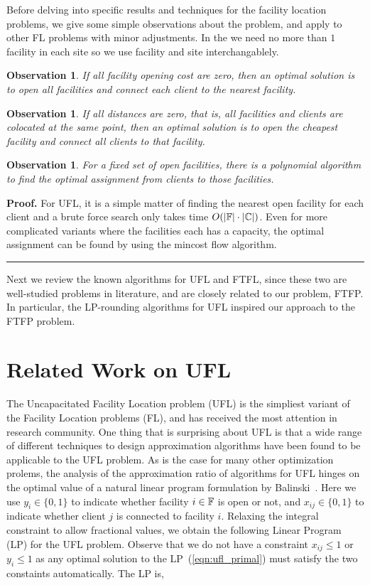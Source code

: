 \documentclass[oneside,final]{ucr}
\newtheorem{observation}[theorem]{Observation}
\newenvironment{proof}[1][Proof]{\textbf{#1.} }{\ \rule{0.5em}{0.5em}}
\begin{document}
Before delving into specific results and techniques for the
facility location problems, we give some simple observations
about the {\UFL} problem, and apply to other FL problems
with minor adjustments. In the {\UFL} we need no more than
$1$ facility in each site so we use facility and site
interchangablely.
\begin{observation}
  If all facility opening cost are zero, then an optimal
  solution is to open all facilities and connect each client
  to the nearest facility.
\end{observation}

\begin{observation}
  If all distances are zero, that is, all facilities and
  clients are colocated at the same point, then an optimal
  solution is to open the cheapest facility and connect all
  clients to that facility.
\end{observation}

\begin{observation}
  For a fixed set of open facilities, there is a polynomial
  algorithm to find the optimal assignment from clients to
  those facilities.
\end{observation}
\begin{proof}
  For UFL, it is a simple matter of finding the nearest open
  facility for each client and a brute force search only
  takes time $O(|\mathbb{F}|\cdot |\mathbb{C}|)$. Even for
  more complicated variants where the facilities each has a
  capacity, the optimal assignment can be found by using the
  mincost flow algorithm.
\end{proof}

Next we review the known algorithms for UFL and FTFL, since
these two are well-studied problems in literature, and are
closely related to our problem, FTFP. In particular, the
LP-rounding algorithms for UFL inspired our approach to the
FTFP problem.

\section{Related Work on UFL}
The Uncapacitated Facility Location problem (UFL) is the
simpliest variant of the Facility Location problems (FL),
and has received the most attention in research
community. One thing that is surprising about UFL is that a
wide range of different techniques to design approximation
algorithms have been found to be applicable to the UFL
problem. As is the case for many other optimization prolems,
the analysis of the approximation ratio of algorithms for
UFL hinges on the optimal value of a natural linear program
formulation by Balinski~\cite{Bal66}. Here we use $y_i\in
\{0,1\}$ to indicate whether facility $i\in\mathbb{F}$ is
open or not, and $x_{ij} \in \{0,1\}$ to indicate whether
client $j$ is connected to facility $i$. Relaxing the
integral constraint to allow fractional values, we obtain
the following Linear Program (LP) for the UFL
problem. Observe that we do not have a constraint $x_{ij}
\leq 1$ or $y_i \leq 1$ as any optimal solution to the
LP~(\ref{eqn:ufl_primal}) must satisfy the two constaints
automatically. The LP is,
\end{document}
